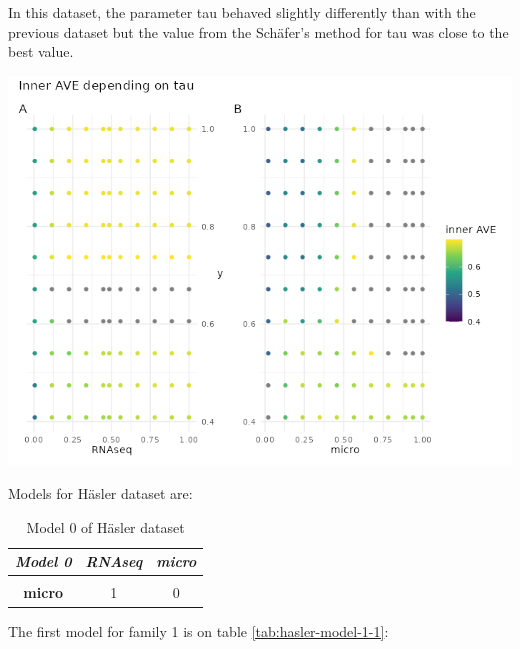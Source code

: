 \documentclass[
  12pt,
  a4paper,
  twoside,
  openright]{book}
\let\origfigure\figure
\let\endorigfigure\endfigure
\renewenvironment{figure}[1][2] {
    \expandafter\origfigure\expandafter[!htp]
} {
    \endorigfigure
}
\begin{document}
In this dataset, the parameter tau behaved slightly differently than with the previous dataset but the value from the Schäfer's method for tau was close to the best value.

\begin{figure}
\includegraphics[width=1\linewidth]{images/hasler-centroid_tau} \caption[Tau effect on inner AVE on the Häsler's dataset.]{Changes on tau on the centroid scheme on the Häsler dataset affect the inner AVE score on the model 1. The panel A shows on the ordinate the RNAseq tau value, the panel B on the right, shows the tau of the microorganism; both of them show the y's tau on the abscissa.}\label{fig:hasler-tau}
\end{figure}

Models for Häsler dataset are:

\begin{table}[H]

\caption[Model 0 of Häsler dataset]{\label{tab:hasler-model-0}Model 0 of Häsler dataset}
\centering
\begin{tabular}[t]{|>{}c|c|>{}c|}
\hline
\em{\textbf{Model 0}} & \em{\textbf{RNAseq}} & \em{\textbf{micro}}\\
\hline
\textbf{\cellcolor{gray!6}{RNAseq}} & \cellcolor{gray!6}{0} & \cellcolor{gray!6}{1}\\
\hline
\textbf{micro} & 1 & 0\\
\hline
\end{tabular}
\end{table}

The first model for family 1 is on table \ref{tab:hasler-model-1-1}:
\end{document}
